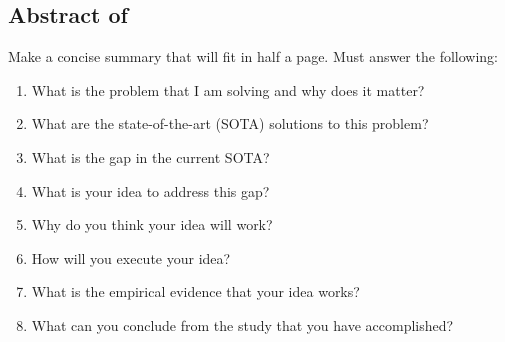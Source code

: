 \begin{singlespace}
    \chapter{Abstract of \Type}
\end{singlespace}

Make a concise summary that will fit in half a page. Must answer the following:
\begin{enumerate}
    \item What is the problem that I am solving and why does it matter?
    \item What are the state-of-the-art (SOTA) solutions to this problem?
    \item What is the gap in the current SOTA?
    \item What is your idea to address this gap?
    \item Why do you think your idea will work?
    \item How will you execute your idea?
    \item What is the empirical evidence that your idea works?
    \item What can you conclude from the study that you have accomplished?
\end{enumerate}
